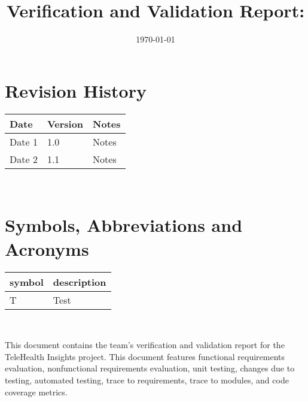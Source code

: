 \documentclass[12pt, titlepage]{article}
\begin{document}
\title{Verification and Validation Report: \progname} 
\author{\authname}
\date{\today}
	
\maketitle


\section{Revision History}

\begin{tabularx}{\textwidth}{p{3cm}p{2cm}X}
\toprule {\bf Date} & {\bf Version} & {\bf Notes}\\
\midrule
Date 1 & 1.0 & Notes\\
Date 2 & 1.1 & Notes\\
\bottomrule
\end{tabularx}

~\newpage

\section{Symbols, Abbreviations and Acronyms}

\renewcommand{\arraystretch}{1.2}
\begin{tabular}{l l} 
  \toprule		
  \textbf{symbol} & \textbf{description}\\
  \midrule 
  T & Test\\
  \bottomrule
\end{tabular}\\


\newpage

\tableofcontents

\listoftables %

\listoffigures %

\newpage


\hspace{2em}This document contains the team's verification and validation report for the TeleHealth
Insights project. This document features functional requirements evaluation, nonfunctional requirements
evaluation, unit testing, changes due to testing, automated testing, trace to requirements, trace to modules,
and code coverage metrics.
\end{document}
